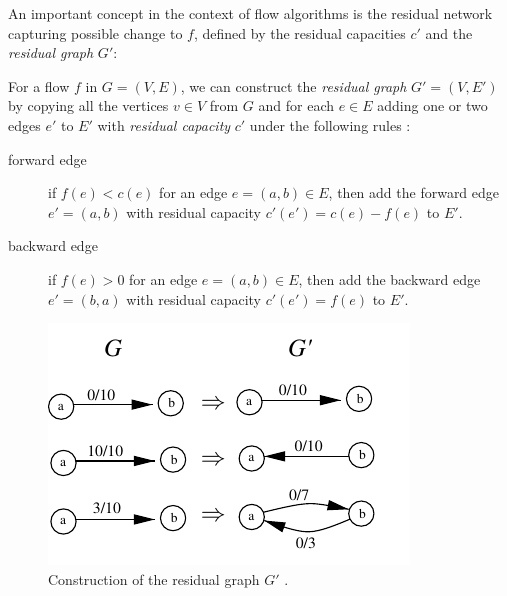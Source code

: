 An important concept in the context of flow algorithms is the residual network capturing possible change to $f$, defined by the residual capacities $c'$ and the \textit{residual graph} $G'$:
\begin{definition}
For a flow $f$ in $G=(V,E)$, we can construct the \textit{residual graph} $G' = (V,E')$ by copying all the vertices $v \in V$ from $G$ and for each $e \in E$ adding one or two edges $e'$ to $E'$ with \textit{residual capacity} $c'$ under the following rules :
\begin{description}
\item[forward edge] if $f(e) < c(e)$ for an edge $e=(a,b) \in E$, then add the forward edge $e' = (a,b)$ with residual capacity $c'(e') = c(e) - f(e)$ to $E'$.
\item[backward edge] if $f(e) > 0$ for an edge $e=(a,b) \in E$, then add the backward edge $e' = (b,a)$ with residual capacity $c'(e') = f(e)$ to $E'$.
\end{description}
\end{definition}

\begin{figure}
\centering
\includegraphics[]{fig/residual}
\caption{Construction of the residual graph $G'$ \cite{mayer2013prakt}.}
\label{fig:residual}
\end{figure}


\section{\pushRelabel{}}



